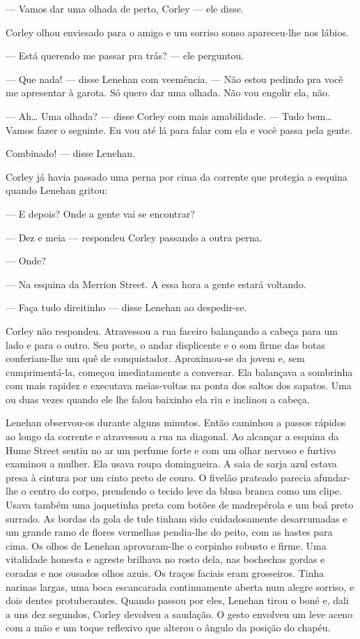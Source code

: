 --- Vamos dar uma olhada de perto, Corley --- ele disse.

Corley olhou enviesado para o amigo e um sorriso sonso apareceu-lhe nos lábios.

--- Está querendo me passar pra trás? --- ele perguntou.

--- Que nada! --- disse Lenehan com veemência.  --- Não estou pedindo pra você
me apresentar à garota.  Só quero dar uma olhada.  Não vou engolir ela, não.

--- Ah\ldots{} Uma olhada? --- disse Corley com mais amabilidade.  --- Tudo
bem\ldots{} Vamos fazer o seguinte.  Eu vou até lá para falar com ela e você
passa pela gente.

Combinado! --- disse Lenehan.

Corley já havia passado uma perna por cima da corrente que protegia a esquina
quando Lenehan gritou:

--- E depois?  Onde a gente vai se encontrar?

--- Dez e meia --- respondeu Corley passando a outra perna.

--- Onde?

--- Na esquina da Merrion Street.  A essa hora a gente estará voltando.

--- Faça tudo direitinho --- disse Lenehan ao despedir-se.

Corley não respondeu.  Atravessou a rua faceiro balançando a cabeça para um
lado e para o outro.  Seu porte, o andar displicente e o som firme das botas
conferiam-lhe um quê de conquistador.  Aproximou-se da jovem e, sem
cumprimentá-la, começou imediatamente a conversar.  Ela balançava a sombrinha
com mais rapidez e executava meias-voltas na ponta dos saltos dos sapatos.  Uma
ou duas vezes quando ele lhe falou baixinho ela riu e inclinou a cabeça.

Lenehan observou-os durante alguns minutos.  Então caminhou a passos rápidos ao
longo da corrente e atravessou a rua na diagonal.  Ao alcançar a esquina da
Hume Street sentiu no ar um perfume forte e com um olhar nervoso e furtivo
examinou a mulher.  Ela usava roupa domingueira.  A saia de sarja azul estava
presa à cintura por um cinto preto de couro.  O fivelão prateado parecia
afundar-lhe o centro do corpo, prendendo o tecido leve da blusa branca como um
clipe.  Usava também uma jaquetinha preta com botões de madrepérola e um boá
preto surrado.  As bordas da gola de tule tinham sido cuidadosamente
desarrumadas e um grande ramo de flores vermelhas pendia-lhe do peito, com as
hastes para cima.  Os olhos de Lenehan aprovaram-lhe o corpinho robusto e
firme.  Uma vitalidade honesta e agreste brilhava no rosto dela, nas bochechas
gordas e coradas e nos ousados olhos azuis.  Os traços faciais eram grosseiros.
Tinha narinas largas, uma boca escancarada continuamente aberta num alegre
sorriso, e dois dentes protuberantes.  Quando passou por eles, Lenehan tirou o
boné e, dali a uns dez segundos, Corley devolveu a saudação.  O gesto envolveu
um leve aceno com a mão e um toque reflexivo que alterou o ângulo da posição do
chapéu.

